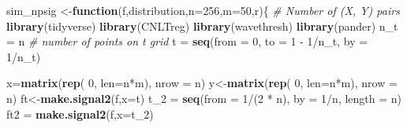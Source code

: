 \documentclass[12pt,twoside, a4paper]{reedthesis}
\newenvironment{Shaded}{}{}
\newcommand{\CommentTok}[1]{\textcolor[rgb]{0.38,0.63,0.69}{\textit{#1}}}
\newcommand{\ControlFlowTok}[1]{\textcolor[rgb]{0.00,0.44,0.13}{\textbf{#1}}}
\newcommand{\DataTypeTok}[1]{\textcolor[rgb]{0.56,0.13,0.00}{#1}}
\newcommand{\DecValTok}[1]{\textcolor[rgb]{0.25,0.63,0.44}{#1}}
\newcommand{\KeywordTok}[1]{\textcolor[rgb]{0.00,0.44,0.13}{\textbf{#1}}}
\newcommand{\NormalTok}[1]{#1}
\newcommand{\OperatorTok}[1]{\textcolor[rgb]{0.40,0.40,0.40}{#1}}
\newcommand{\StringTok}[1]{\textcolor[rgb]{0.25,0.44,0.63}{#1}}
\begin{document}
\begin{Shaded}
\begin{Highlighting}[]
\NormalTok{sim_npsig <-}\ControlFlowTok{function}\NormalTok{(f,distribution,}\DataTypeTok{n=}\DecValTok{256}\NormalTok{,}\DataTypeTok{m=}\DecValTok{50}\NormalTok{,r)\{}
  \CommentTok{# Number of (X, Y) pairs}
  \KeywordTok{library}\NormalTok{(tidyverse)}
  \KeywordTok{library}\NormalTok{(CNLTreg)}
  \KeywordTok{library}\NormalTok{(wavethresh)}
  \KeywordTok{library}\NormalTok{(pander)}
\NormalTok{  n_t =}\StringTok{ }\NormalTok{n }\CommentTok{# number of points on t grid}
\NormalTok{  t =}\StringTok{ }\KeywordTok{seq}\NormalTok{(}\DataTypeTok{from =} \DecValTok{0}\NormalTok{, }\DataTypeTok{to =} \DecValTok{1} \OperatorTok{-}\StringTok{ }\DecValTok{1}\OperatorTok{/}\NormalTok{n_t, }\DataTypeTok{by =} \DecValTok{1}\OperatorTok{/}\NormalTok{n_t)}

\NormalTok{  x=}\KeywordTok{matrix}\NormalTok{(}\KeywordTok{rep}\NormalTok{( }\DecValTok{0}\NormalTok{, }\DataTypeTok{len=}\NormalTok{n}\OperatorTok{*}\NormalTok{m), }\DataTypeTok{nrow =}\NormalTok{ n)}
\NormalTok{  y<-}\KeywordTok{matrix}\NormalTok{(}\KeywordTok{rep}\NormalTok{( }\DecValTok{0}\NormalTok{, }\DataTypeTok{len=}\NormalTok{n}\OperatorTok{*}\NormalTok{m), }\DataTypeTok{nrow =}\NormalTok{ n)}
\NormalTok{  ft<-}\KeywordTok{make.signal2}\NormalTok{(f,}\DataTypeTok{x=}\NormalTok{t)}
\NormalTok{  t_}\DecValTok{2}\NormalTok{ =}\StringTok{ }\KeywordTok{seq}\NormalTok{(}\DataTypeTok{from =} \DecValTok{1}\OperatorTok{/}\NormalTok{(}\DecValTok{2} \OperatorTok{*}\StringTok{ }\NormalTok{n), }\DataTypeTok{by =} \DecValTok{1}\OperatorTok{/}\NormalTok{n, }\DataTypeTok{length =}\NormalTok{ n)}
\NormalTok{  ft2 =}\StringTok{ }\KeywordTok{make.signal2}\NormalTok{(f,}\DataTypeTok{x=}\NormalTok{t_}\DecValTok{2}\NormalTok{)}


\end{Highlighting}
\end{Shaded}
\end{document}
